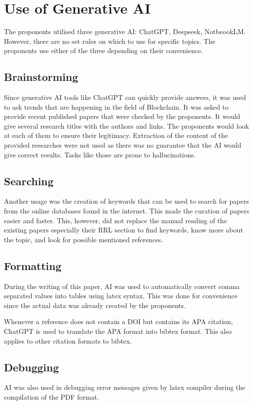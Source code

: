 \chapter{Use of Generative AI}
The proponents utilised three generative AI: ChatGPT, Deepseek, NotbeookLM. However, there are no set rules on which to use for specific topics. The proponents use either of the three depending on their convenience.

\section{Brainstorming}
Since generative AI tools like ChatGPT can quickly provide answers, it was used to ask trends that are happening in the field of Blockchain. It was asked to provide recent published papers that were checked by the proponents. It would give several research titles with the authors and links. The proponents would look at each of them to ensure their legitimacy. Extraction of the content of the provided researches were not used as there was no guarantee that the AI would give correct results. Tasks like those are prone to hallucinations.  

\section{Searching}
Another usage was the creation of keywords that can be used to search for papers from the online databases found in the internet. This made the curation of papers easier and faster. This, however, did not replace the manual reading of the existing papers especially their RRL section to find keywords, know more about the topic, and look for possible mentioned references. 

\section{Formatting}
During the writing of this paper, AI was used to automatically convert comma separated values into tables using latex syntax. This was done for convenience since the actual data was already created by the proponents.

Whenever a reference does not contain a DOI but contains its APA citation, ChatGPT is used to translate the APA format into bibtex format. This also applies to other citation formats to bibtex.

\section{Debugging}
AI was also used in debugging error messages given by latex compiler during the compilation of the PDF format.
